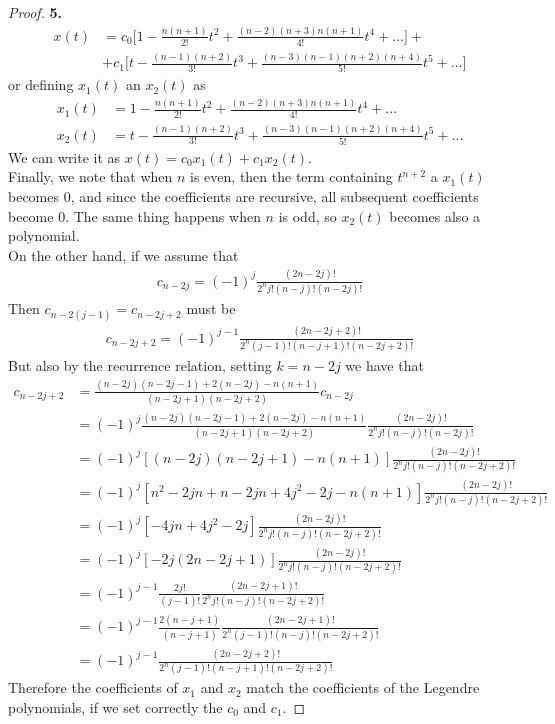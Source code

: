 \documentclass[11pt]{article}
\theoremstyle{definition}
\begin{document}
\begin{proof}{\textbf{5.}}
\begin{align*}
    x(t) &= c_0\bigg[
        1 - \frac{n(n+1)}{2!}t^2 + \frac{(n -2)(n + 3)n(n+1)}{4!}t^4 + ...
    \bigg] + \\
    &+ c_1\bigg[
        t - \frac{(n-1)(n+2)}{3!}t^3
        + \frac{(n - 3)(n - 1)(n + 2)(n + 4)}{5!}t^5 + ...
    \bigg]
\end{align*}
or defining $x_1(t)$ an $x_2(t)$ as
\begin{align*}
    x_1(t) &= 1 - \frac{n(n+1)}{2!}t^2 + \frac{(n -2)(n + 3)n(n+1)}{4!}t^4 + ...\\
    x_2(t) &= t - \frac{(n-1)(n+2)}{3!}t^3
    + \frac{(n - 3)(n - 1)(n + 2)(n + 4)}{5!}t^5 + ...
\end{align*}
We can write it as $x(t) = c_0 x_1(t) + c_1 x_2(t)$.\\
Finally, we note that when $n$ is even, then the term containing $t^{n+2}$ a
$x_1(t)$ becomes 0, and since the coefficients are recursive, all subsequent
coefficients become 0. The same thing happens when $n$ is odd, so $x_2(t)$
becomes also a polynomial.\\
On the other hand, if we assume that 
\begin{align*}
    c_{n-2j} = (-1)^j \frac{(2n - 2j)!}{2^n j! (n-j)! (n -2j)!}
\end{align*}
Then $c_{n- 2(j-1)} = c_{n -2j +2}$ must be
\begin{align*}
    c_{n-2j+ 2} = (-1)^{j-1} \frac{(2n - 2j + 2)!}{2^n (j-1)! (n-j+1)! (n -2j + 2)!}
\end{align*}
But also by the recurrence relation, setting $k=n - 2j$ we have that
\begin{align*}
    c_{n - 2j + 2} &= \frac{(n-2j)(n-2j-1) + 2(n - 2j) - n(n+1)}
    {(n - 2j + 1)(n - 2j + 2)}c_{n-2j}\\
    &= (-1)^j\frac{(n-2j)(n-2j-1) + 2(n - 2j) - n(n+1)}
    {(n - 2j + 1)(n - 2j + 2)}\frac{(2n - 2j)!}{2^n j! (n-j)! (n -2j)!}\\
    &= (-1)^j[(n-2j)(n-2j + 1) - n(n+1)]
    \frac{(2n - 2j)!}{2^n j! (n-j)! (n -2j + 2)!}\\
    &= (-1)^j[n^2 -2jn + n -2jn + 4j^2 - 2j - n(n+1)]
    \frac{(2n - 2j)!}{2^n j! (n-j)! (n -2j + 2)!}\\
    &= (-1)^j[-4jn + 4j^2 - 2j]
    \frac{(2n - 2j)!}{2^n j! (n-j)! (n -2j + 2)!}\\
    &= (-1)^j[-2j(2n - 2j + 1)]
    \frac{(2n - 2j)!}{2^n j! (n-j)! (n -2j + 2)!}\\
    &= (-1)^{j-1}\frac{2j!}{(j-1)!}
    \frac{(2n - 2j + 1)!}{2^n j! (n-j)! (n -2j + 2)!}\\
    &= (-1)^{j-1}\frac{2(n - j + 1)}{(n -j + 1)}
    \frac{(2n - 2j + 1)!}{2^n (j-1)! (n-j)! (n -2j + 2)!}\\
    &= (-1)^{j-1}\frac{(2n - 2j + 2)!}{2^n (j-1)! (n-j + 1)! (n -2j + 2)!}
\end{align*}
Therefore the coefficients of $x_1$ and $x_2$ match the coefficients of the
Legendre polynomials, if we set correctly the $c_0$ and $c_1$.
\end{proof}
\end{document}

